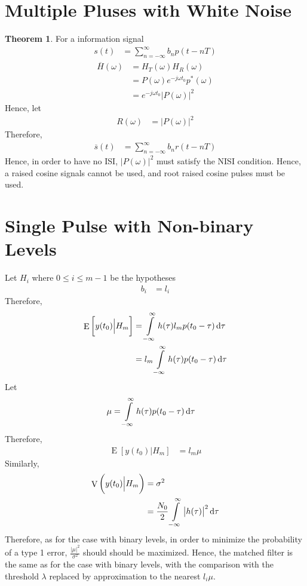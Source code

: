 \documentclass[titlepage, fleqn, a4paper, 12pt, twoside]{article}
\theoremstyle{definition}
\theoremstyle{theorem}
\newtheorem{theorem}{Theorem}
\DeclareMathOperator{\expct}{\mathrm{E}}
\DeclareMathOperator{\var}{\mathrm{V}}
\begin{document}
\section{Multiple Pluses with White Noise}

\begin{theorem}
	For a information signal
	\begin{align*}
		s(t) &= \sum\limits_{n = -\infty}^{\infty} b_n p(t - n T)
	\end{align*}
	\begin{align*}
		\overline{H}(\omega) &= H_T(\omega) H_R(\omega)\\
		&= P(\omega) e^{-j \omega t_0} p^*(\omega)\\
		&= e^{-j \omega t_0} \left| P(\omega) \right|^2
	\end{align*}
	Hence, let
	\begin{align*}
		R(\omega) &= \left| P(\omega) \right|^2
	\end{align*}
	Therefore,
	\begin{align*}
		\overline{s}(t) &= \sum\limits_{n = -\infty}^{\infty} b_n r(t - n T)
	\end{align*}
	Hence, in order to have no ISI, $\left| P(\omega) \right|^2$ must satisfy the NISI condition.
	Hence, a raised cosine signals cannot be used, and root raised cosine pulses must be used.
\end{theorem}

\section{Single Pulse with Non-binary Levels}

Let $H_i$ where $0 \le i \le m - 1$ be the hypotheses
\begin{align*}
	b_i &= l_i
\end{align*}
Therefore,
\begin{align*}
	\expct\left[ y(t_0) \Big| H_m \right] &= \int\limits_{-\infty}^{\infty} h(\tau) l_m p(t_0 - \tau) \dif \tau\\
	&= l_m \int\limits_{-\infty}^{\infty} h(\tau) p(t_0 - \tau) \dif \tau
\end{align*}
Let
\begin{align*}
	\mu &= \int\limits_{-\infty}^{\infty} h(\tau) p(t_0 - \tau) \dif \tau
\end{align*}
Therefore,
\begin{align*}
	\expct\left[ y(t_0) \Big| H_m \right] &= l_m \mu
\end{align*}
Similarly,
\begin{align*}
	\var\left( y(t_0) \Big| H_m \right) &= \sigma^2\\
	&= \frac{N_0}{2} \int\limits_{-\infty}^{\infty} \left| h(\tau) \right|^2 \dif \tau
\end{align*}
Therefore, as for the case with binary levels, in order to minimize the probability of a type 1 error, $\frac{|\mu|^2}{\sigma^2}$ should should be maximized.
Hence, the matched filter is the same as for the case with binary levels, with the comparison with the threshold $\lambda$ replaced by approximation to the nearest $l_i \mu$.
\end{document}
